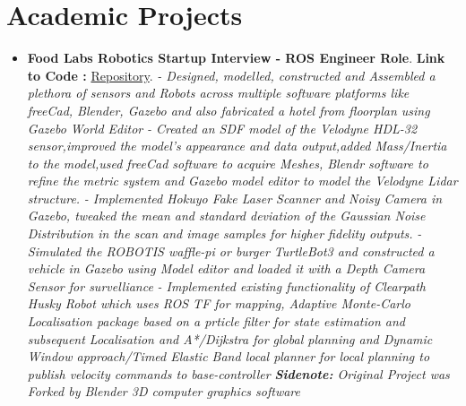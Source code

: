\documentclass[a4paper,12pt]{article}
\begin{document}
\section*{Academic Projects}
\begin{itemize}
    \item{\textbf{\large{Food Labs Robotics Startup Interview - ROS Engineer Role}}.
    \newline
    \textbf{ Link to Code :} \href{https://github.com/teetangh/Kaustav-ROS-Workspace}{Repository}.
    \newline
    \textit{- Designed, modelled, constructed and
    Assembled a plethora of sensors and Robots across multiple software platforms like
    freeCad, Blender, Gazebo and also fabricated a hotel from floorplan using Gazebo World Editor}
    \newline
    \textit{- Created an SDF model of the Velodyne HDL-32 sensor,improved the model's appearance and data output,added Mass/Inertia to the model,used freeCad software to acquire Meshes, Blendr software to refine the metric system and Gazebo model editor to model the Velodyne Lidar structure.}
    \newline
    \textit{- Implemented Hokuyo Fake Laser Scanner and Noisy Camera in Gazebo, tweaked the mean and standard deviation of the Gaussian Noise Distribution in the scan and image samples for higher fidelity outputs.}
    \newline
    \textit{- Simulated the ROBOTIS waffle-pi or burger TurtleBot3 and constructed a vehicle in Gazebo using Model editor and loaded it with a Depth Camera Sensor for survelliance}
    \newline
    \textit{- Implemented existing functionality of Clearpath Husky Robot which uses ROS TF for mapping, Adaptive Monte-Carlo Localisation package based on a prticle filter for state estimation and subsequent Localisation and A*/Dijkstra for global planning and Dynamic Window approach/Timed Elastic Band local planner for local planning to publish velocity commands to base-controller}
    \newline
    \textit{\textbf{Sidenote:} Original Project was Forked by Blender 3D computer graphics software }}
    \newline


\end{itemize}
\end{document}
